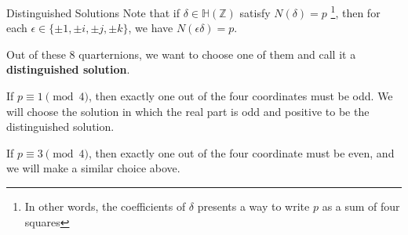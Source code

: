 \documentclass[10pt]{beamer}
\theoremstyle{definition}\newtheorem{proposition}{Proposition}
\begin{document}
\begin{frame}{Distinguished Solutions}
Note that if $\delta \in \mathbb{H}(\mathbb{Z})$ satisfy $N(\delta) = p$ \footnote{In other words, the coefficients of $\delta$ presents a way to write $p$ as a sum of four squares}, then for each $\epsilon \in \{\pm 1, \pm i, \pm j, \pm k\}$, we have $N(\epsilon \delta) = p$. \pause

Out of these 8 quarternions, we want to choose one of them and call it a \textbf{distinguished solution}.\pause

If $p \equiv 1 \pmod{4}$, then exactly one out of the four coordinates must be odd. We will choose the solution in which the real part is odd and positive to be the distinguished solution. 

If $p \equiv 3 \pmod{4}$, then exactly one out of the four coordinate must be even, and we will make a similar choice above.
\end{frame}
\end{document}
